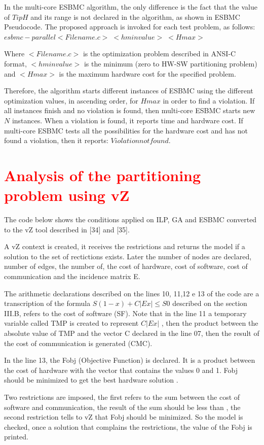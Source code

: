 In the multi-core ESBMC algorithm, the only difference is the fact that the value of $ TipH $ and its range is not declared in the algorithm, as shown in ESBMC Pseudocode. The proposed approach is invoked for each test problem, as follows:
$ esbmc-parallel <Filename.c> \; <hminvalue> \; <Hmax> $

Where $ <Filename.c> $ is the optimization problem described in ANSI-C format, $  <hminvalue> $ is the minimum (zero to HW-SW partitioning problem) and $ <Hmax> $ is the maximum hardware cost for the specified problem.

Therefore, the algorithm starts  different instances of ESBMC using the different optimization values, in ascending order, for $ Hmax $ in order to find a violation. If all instances finish and no violation is found, then multi-core ESBMC starts new $ N $ instances. When a violation is found, it reports time and hardware cost. If multi-core ESBMC tests all the possibilities for the hardware cost and has not found a violation, then it reports: $ Violation not found $.

\section{\textcolor{Red}{Analysis of the partitioning problem using vZ}}
The code below shows the conditions applied on ILP, GA and ESBMC converted to the vZ tool described in [34] and [35]. 

A vZ context is created, it receives the restrictions and returns the model if a solution to the set of rectictions exists. Later the number of nodes are declared, number of edges, the number of, the cost of hardware, cost of software, cost of communication and the incidence matrix E.

The arithmetic declarations described on the lines 10, 11,12 e 13 of the code are a transcription of the formula $ S(1-x) + C|Ex| \leq S{0} $ described on the section III.B, refers to the cost of software (SF). Note that in the line 11 a temporary variable called TMP is created to represent $C|Ex|$  , then the product between the absolute value of TMP and the vector C declared in the line 07, then the result of the cost of communication is generated (CMC). 

In the line 13, the Fobj (Objective Function) is declared. It is a product between the cost of hardware with the vector that contains the values 0 and 1. Fobj should be minimized to get the best hardware solution .

Two restrictions are imposed, the first refers to the sum between the cost of software and communication, the result of the sum should be less than , the second restriction tells to vZ that Fobj should be minimized. So the model is checked, once a solution that complains the restrictions, the value of the Fobj is printed.

